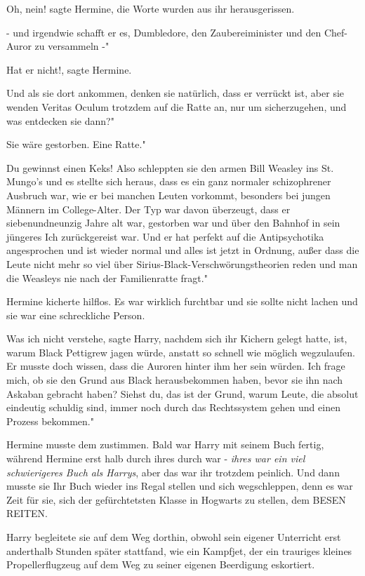 \glqq Oh, nein!\grqq{} sagte Hermine, die Worte wurden aus ihr herausgerissen.

\glqq - und irgendwie schafft er es, Dumbledore, den Zaubereiminister und den
Chef-Auror zu versammeln -"

\glqq Hat er nicht!\grqq{}, sagte Hermine.

\glqq Und als sie dort ankommen, denken sie natürlich, dass er verrückt ist,
aber sie wenden Veritas Oculum trotzdem auf die Ratte an, nur um sicherzugehen,
und was entdecken sie dann?"

Sie wäre gestorben. \glqq Eine Ratte."

\glqq Du gewinnst einen Keks! Also schleppten sie den armen Bill Weasley ins St.
Mungo's und es stellte sich heraus, dass es ein ganz normaler schizophrener
Ausbruch war, wie er bei manchen Leuten vorkommt, besonders bei jungen Männern
im College-Alter. Der Typ war davon überzeugt, dass er siebenundneunzig Jahre
alt war, gestorben war und über den Bahnhof in sein jüngeres Ich zurückgereist
war. Und er hat perfekt auf die Antipsychotika angesprochen und ist wieder
normal und alles ist jetzt in Ordnung, außer dass die Leute nicht mehr so viel
über Sirius-Black-Verschwörungstheorien reden und man die Weasleys nie nach der
Familienratte fragt."

Hermine kicherte hilflos. Es war wirklich furchtbar und sie sollte nicht lachen
und sie war eine schreckliche Person.

\glqq Was ich nicht verstehe\grqq{}, sagte Harry, nachdem sich ihr Kichern
gelegt hatte, \glqq ist, warum Black Pettigrew jagen würde, anstatt so schnell
wie möglich wegzulaufen. Er musste doch wissen, dass die Auroren hinter ihm her
sein würden. Ich frage mich, ob sie den Grund aus Black herausbekommen haben,
bevor sie ihn nach Askaban gebracht haben? Siehst du, das ist der Grund, warum
Leute, die absolut eindeutig schuldig sind, immer noch durch das Rechtssystem
gehen und einen Prozess bekommen."

Hermine musste dem zustimmen. Bald war Harry mit seinem Buch fertig, während
Hermine erst halb durch ihres durch war - \emph{ihres war ein viel schwierigeres
Buch als Harrys}, aber das war ihr trotzdem peinlich. Und dann musste sie Ihr
Buch wieder ins Regal stellen und sich wegschleppen, denn es war Zeit für sie,
sich der gefürchtetsten Klasse in Hogwarts zu stellen, dem BESEN REITEN.

Harry begleitete sie auf dem Weg dorthin, obwohl sein eigener Unterricht erst
anderthalb Stunden später stattfand, wie ein Kampfjet, der ein trauriges kleines
Propellerflugzeug auf dem Weg zu seiner eigenen Beerdigung eskortiert.


